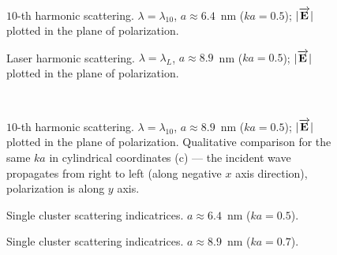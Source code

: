     \begin{figure}[H]
        \hfil
        \caption{$10$-th harmonic scattering. $\lambda = \lambda_{10}$, $a \approx 6.4$~nm ($ka = 0.5$); $|\overrightarrow{\textbf{E}_{}}|$ plotted in the plane of polarization.}
        \label{10h_ka0.5:image}
    \end{figure}

    \begin{figure}[H]
        \hfil
        \caption{Laser harmonic scattering. $\lambda = \lambda_{L}$, $a \approx 8.9$~nm ($ka = 0.5$); $|\overrightarrow{\textbf{E}_{}}|$ plotted in the plane of polarization.}
        \label{1h_ka0.7:image}
    \end{figure}

    \begin{figure}[H]
        \hfil
        \\
        \caption{$10$-th harmonic scattering. $\lambda = \lambda_{10}$, $a \approx 8.9$~nm ($ka = 0.5$); $|\overrightarrow{\textbf{E}_{}}|$ plotted in the plane of polarization. Qualitative comparison for the same $ka$ in cylindrical coordinates (c) --- the incident wave propagates from right to left (along negative $x$ axis direction), polarization is along $y$ axis.}
        \label{10h_ka0.7:image}
    \end{figure}

    \begin{figure}[H]
        \hfil
        \caption{Single cluster scattering indicatrices. $a \approx 6.4$~nm ($ka = 0.5$).}
        \label{ka0.5_far_field:image}
    \end{figure}

    \begin{figure}[H]
        \hfil
        \caption{Single cluster scattering indicatrices. $a \approx 8.9$~nm ($ka = 0.7$).}
        \label{ka0.7_far_field:image}
    \end{figure}